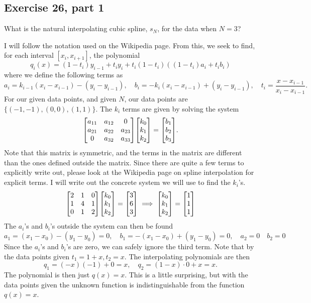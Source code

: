 \subsection{Exercise 26, part 1}
What is the natural interpolating cubic spline, $s_N$, for the data when $N = 3$?
\vspace{-5mm}\partbreak
\begin{solution}

    I will follow the notation used on the Wikipedia page. From this, we seek to find, for each interval $[x_i, x_{i+1}]$, the polynomial
    \[q_i(x) = (1 - t_i)y_{i-1} + t_iy_i + t_i(1-t_i)((1-t_i)a_i + t_ib_i)\]
    where we define the following terms as
    \[a_i = k_{i-1}(x_i - x_{i-1}) - (y_i - y_{i-1}), \quad b_i = -k_i(x_i - x_{i-1}) + (y_i - y_{i-1}), \quad t_i = \frac{x - x_{i-1}}{x_i - x_{i-1}}.\]
    For our given data points, and given $N$, our data points are $\{(-1, -1), (0, 0), (1, 1)\}$. The $k_i$ terms are given by solving the system
    \[\mqty[a_{11} & a_{12}&0\\a_{21}&a_{22}&a_{23}\\0&a_{32}&a_{33}]\mqty[k_0\\k_1\\k_2] = \mqty[b_1\\b_2\\b_3].\]
    Note that this matrix is symmetric, and the terms in the matrix are different than the ones defined outside the matrix. Since there are quite a few terms to explicitly write out, please look at the Wikipedia page on spline interpolation for explicit terms. I will write out the concrete system we will use to find the $k_i$'s.
    \[\mqty[2&1&0\\1&4&1\\0&1&2]\mqty[k_0\\k_1\\k_2] = \mqty[3\\6\\3] \implies \mqty[k_0\\k_1\\k_2] = \mqty[1\\1\\1]\]
    The $a_i$'s and $b_i$'s outside the system can then be found
    \[a_1 = (x_1 - x_0) - (y_1 - y_0) = 0, \quad b_1 = -(x_1 - x_0) + (y_1 - y_0) = 0, \quad a_2 = 0 \quad b_2 = 0\]
    Since the $a_i$'s and $b_i$'s are zero, we can safely ignore the third term. Note that by the data points given $t_1 = 1 + x, t_2 = x$. The interpolating polynomials are then
    \[q_1 = (-x)(-1) + 0 = x, \quad q_2 = (1 - x)\cdot 0 + x = x.\]
    The polynomial is then just $q(x) = x$. This is a little surprising, but with the data points given the unknown function is indistinguishable from the function $q(x) = x$. 
\end{solution}

